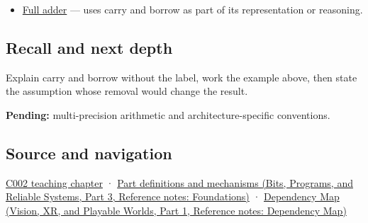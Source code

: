 \hypertarget{appendix-d52d5f78ffd1-used-by}{}

\begin{itemize}
\tightlist
\item
  \hyperref[appendix-d1a5b1e520c2]{Full adder} --- uses carry and borrow as part of its representation or reasoning.
\end{itemize}

\subsection{Recall and next depth}\label{appendix-d52d5f78ffd1-recall-and-next-depth}

\hypertarget{appendix-d52d5f78ffd1-recall-and-next-depth}{}

Explain carry and borrow without the label, work the example above, then state the assumption whose removal would change the result.

\textbf{Pending:} multi-precision arithmetic and architecture-specific conventions.

\subsection{Source and navigation}\label{appendix-d52d5f78ffd1-source-and-navigation}

\hypertarget{appendix-d52d5f78ffd1-source-and-navigation}{}

\hyperref[01-foundations-i-ch001-arithmetic-becomes-a-policy]{C002 teaching chapter} · \href{../01-Bits-Programs-and-Reliable-Systems-P03/main.pdf\#appendix-fd090d982a15}{Part definitions and mechanisms (Bits, Programs, and Reliable Systems, Part 3, Reference notes: Foundations)} · \href{../07-Vision-XR-and-Playable-Worlds-P01/main.pdf\#appendix-4ad47bdd269a}{Dependency Map (Vision, XR, and Playable Worlds, Part 1, Reference notes: Dependency Map)}
